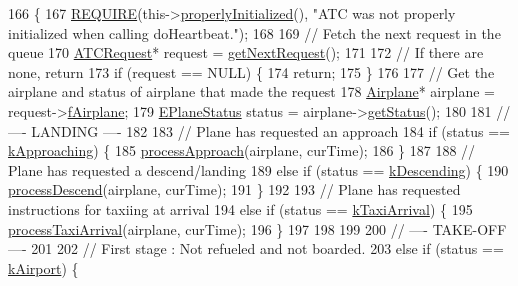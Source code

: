 \begin{DoxyCode}
166                                   \{
167     \hyperlink{DesignByContract_8h_aeb774672b46dbe80afc14e0d1970f017}{REQUIRE}(this->\hyperlink{classATC_a6b6a10a87c06028bd96d6e5efff170b7}{properlyInitialized}(), \textcolor{stringliteral}{"ATC was not properly initialized when
       calling doHeartbeat."});
168 
169     \textcolor{comment}{// Fetch the next request in the queue}
170     \hyperlink{structATCRequest}{ATCRequest}* request = \hyperlink{classATC_a2882681c8a007c3acb80d027807d8f50}{getNextRequest}();
171 
172     \textcolor{comment}{// If there are none, return}
173     \textcolor{keywordflow}{if} (request == NULL) \{
174         \textcolor{keywordflow}{return};
175     \}
176 
177     \textcolor{comment}{// Get the airplane and status of airplane that made the request}
178     \hyperlink{classAirplane}{Airplane}* airplane = request->\hyperlink{structATCRequest_a681215e14c24388ae811f182c33e4403}{fAirplane};
179     \hyperlink{Airplane_8h_a0e5bbf7c6c727baaba49062300fae19f}{EPlaneStatus} status = airplane->\hyperlink{classAirplane_a40bbb3024a476115700977c60bae2705}{getStatus}();
180 
181     \textcolor{comment}{// ---- LANDING ----}
182 
183     \textcolor{comment}{// Plane has requested an approach}
184     \textcolor{keywordflow}{if} (status == \hyperlink{Airplane_8h_a0e5bbf7c6c727baaba49062300fae19fa2c6325ac177ddfbe70edf92941c4e8e0}{kApproaching}) \{
185         \hyperlink{classATC_a4adc92a57a78b6e201164d17c88886cf}{processApproach}(airplane, curTime);
186     \}
187 
188     \textcolor{comment}{// Plane has requested a descend/landing}
189     \textcolor{keywordflow}{else} \textcolor{keywordflow}{if} (status == \hyperlink{Airplane_8h_a0e5bbf7c6c727baaba49062300fae19fa65b72f8e33cb194d21d822e5b6626e2e}{kDescending}) \{
190         \hyperlink{classATC_ad9fa691584f1f5d78aa9debf9fe2f4c8}{processDescend}(airplane, curTime);
191     \}
192 
193     \textcolor{comment}{// Plane has requested instructions for taxiing at arrival}
194     \textcolor{keywordflow}{else} \textcolor{keywordflow}{if} (status == \hyperlink{Airplane_8h_a0e5bbf7c6c727baaba49062300fae19fabe52f2e86df226a44cc8ba29e8f259b2}{kTaxiArrival}) \{
195         \hyperlink{classATC_ab8957280df7e56cbd9e7cefb4d4d6997}{processTaxiArrival}(airplane, curTime);
196     \}
197 
198 
199 
200     \textcolor{comment}{// ---- TAKE-OFF ----}
201 
202     \textcolor{comment}{// First stage : Not refueled and not boarded.}
203     \textcolor{keywordflow}{else} \textcolor{keywordflow}{if} (status == \hyperlink{Airplane_8h_a0e5bbf7c6c727baaba49062300fae19fabfff972a5d3596bc68662c89987639df}{kAirport}) \{

\end{DoxyCode}
